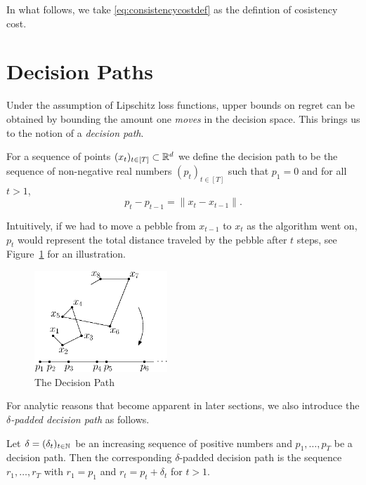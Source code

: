 In what follows, we take \eqref{eq:consistencycostdef} as the defintion of cosistency cost.

\section{Decision Paths}
Under the assumption of Lipschitz loss functions, upper bounds on regret can be obtained by bounding the amount one \emph{moves} in the decision space. This brings us to the notion of a \emph{decision path}.

\begin{definition}
    For a sequence of points $(x_t)_{t\in[T]} \subset \mathbb{R}^d$ we define the decision path to be the sequence of non-negative real numbers $(p_t)_{t\in [T]}$ such that $p_1= 0$ and for all $t > 1$,
\[
  p_t - p_{t-1} = \|x_t - x_{t-1}\|.
\]
\end{definition}
Intuitively, if we had to move a pebble from $x_{t-1}$ to $x_t$ as the algorithm went on, $p_t$ would represent the total distance traveled by the pebble after $t$ steps, see Figure~\ref{fig:decisionpath} for an illustration.
\begin{figure}[h!]
    \centering
    \includegraphics[width=5cm]{figures/decision-path}
    \caption{The Decision Path}
    \label{fig:decisionpath}
\end{figure}

For analytic reasons that become apparent in later sections, we also introduce the \emph{$\delta$-padded decision path} as follows. 
\begin{definition}
Let $\delta = (\delta_t)_{t\in\mathbb{N}}$ be an increasing sequence of positive numbers and  $p_1, \ldots, p_T$ be a decision path. Then the corresponding $\delta$-padded decision path is the sequence $r_1, \ldots, r_T$ with $r_1 = p_1$ and $r_t = p_t + \delta_t$ for $t>1$.
\end{definition} 

